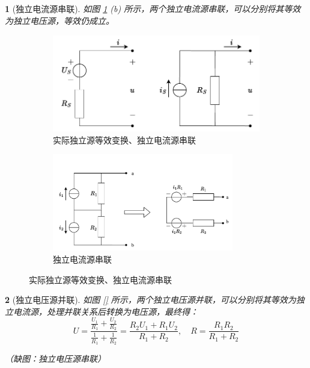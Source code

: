 \documentclass[UTF8]{report}
\theoremstyle{MyLineTheoremStyle} %
\theoremstyle{MyBlockTheoremStyle} %
\theoremstyle{MySubsubsectionStyle} %
\newtheorem{definition}{}
\begin{document}
\begin{definition}[独立电流源串联]
如图 \ref{实际独立源等效变换、独立电流源串联} (b) 所示，两个独立电流源串联，可以分别将其等效为独立电压源，等效仍成立。
\end{definition}

\begin{figure}[H]\centering
\begin{subfigure}[t]{0.53\textwidth}\centering
    \includegraphics[height=120pt]{assets/1,2/独立源等效.drawio.pdf}
    \caption{ 实际独立源等效变换、独立电流源串联 }
\end{subfigure}\begin{subfigure}[t]{0.47\textwidth}\centering
    \includegraphics[height=120pt]{assets/1,2/独立电流源并联.drawio.pdf}
    \caption{ 独立电流源串联 }
\end{subfigure}
\caption{ 实际独立源等效变换、独立电流源串联 }\label{实际独立源等效变换、独立电流源串联}
\end{figure}


\begin{definition}[独立电压源并联]
如图 \ref{} 所示，两个独立电压源并联，可以分别将其等效为独立电流源，处理并联关系后转换为电压源，最终得：
\begin{equation}
U = \frac{\frac{U_1}{R_1} + \frac{U_2}{R_2}}{\frac{1}{R_1} + \frac{1}{R_2}} = \frac{R_2U_1 + R_1U_2}{R_1+R_2}, \quad R = \frac{R_1R_2}{R_1 + R_2}
\end{equation}

{\color{red} （缺图：独立电压源串联）}

\end{definition}
\end{document}
